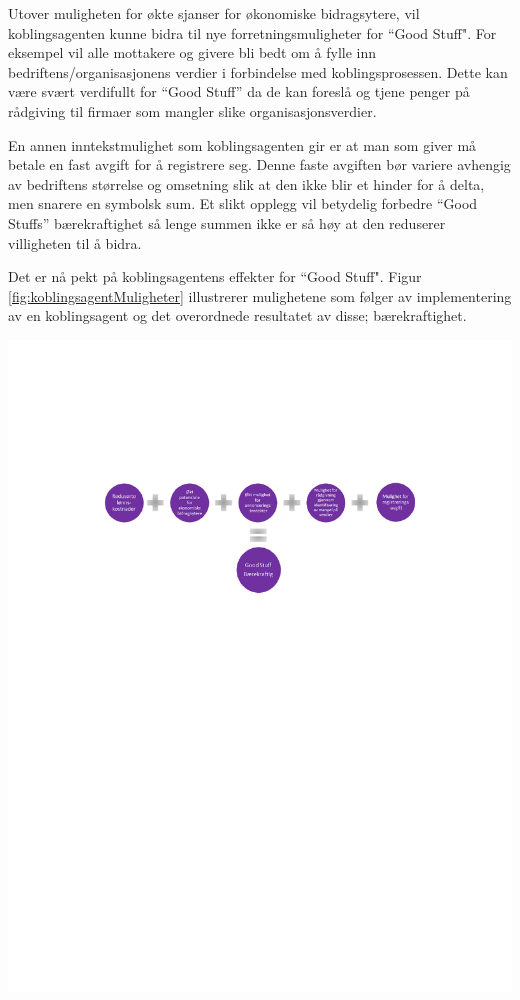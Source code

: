 Utover muligheten for økte sjanser for økonomiske bidragsytere, vil koblingsagenten kunne bidra til nye forretningsmuligheter for ``Good Stuff". For eksempel vil alle mottakere og givere bli bedt om å fylle inn bedriftens/organisasjonens verdier i forbindelse med koblingsprosessen. Dette kan være svært verdifullt for “Good Stuff” da de kan foreslå og tjene penger på rådgiving til firmaer som mangler slike organisasjonsverdier.

En annen inntekstmulighet som koblingsagenten gir er at man som giver må betale en fast avgift for å registrere seg. Denne faste avgiften bør variere avhengig av bedriftens størrelse og omsetning slik at den ikke blir et hinder for å delta, men snarere en symbolsk sum. Et slikt opplegg vil betydelig forbedre “Good Stuffs” bærekraftighet så lenge summen ikke er så høy at den reduserer villigheten til å bidra.

Det er nå pekt på koblingsagentens effekter for ``Good Stuff". Figur \ref{fig:koblingsagentMuligheter} illustrerer mulighetene som følger av implementering av en koblingsagent og det overordnede resultatet av disse; bærekraftighet.

\begin{center}
\includegraphics[clip=true, width=1 \textwidth,
trim=4cm 16cm 4cm 4cm]{koblingsagentMuligheter.pdf}
\label{fig:koblingsagentMuligheter}
\end{center}


